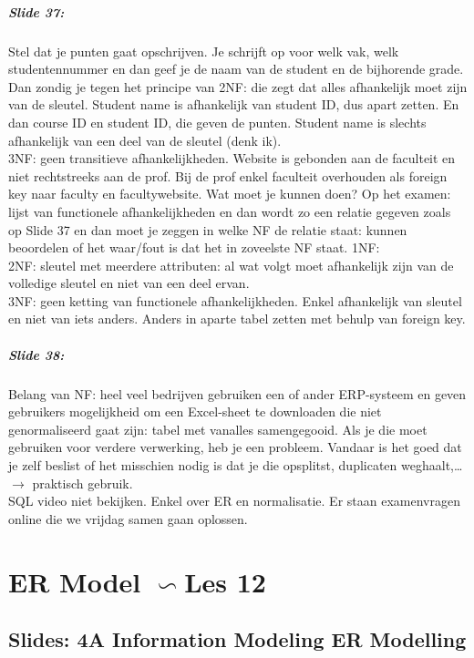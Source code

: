 \documentclass[10pt,a4paper]{report}
\begin{document}
\paragraph{Slide 37:}Stel dat je punten gaat opschrijven. Je schrijft op voor welk vak, welk studentennummer en dan geef je de naam van de student en de bijhorende grade. Dan zondig je tegen het principe van 2NF: die zegt dat alles afhankelijk moet zijn van de sleutel. Student name is afhankelijk van student ID, dus apart zetten. En dan course ID en student ID, die geven de punten. Student name is slechts afhankelijk van een deel van de sleutel (denk ik).\\
3NF: geen transitieve afhankelijkheden. Website is gebonden aan de faculteit en niet rechtstreeks aan de prof. Bij de prof enkel faculteit overhouden als foreign key naar faculty en facultywebsite.
Wat moet je kunnen doen? Op het examen: lijst van functionele afhankelijkheden en dan wordt zo een relatie gegeven zoals op Slide 37 en dan moet je zeggen in welke NF de relatie staat: kunnen beoordelen of het waar/fout is dat het in zoveelste NF staat.
1NF:\\
2NF: sleutel met meerdere attributen: al wat volgt moet afhankelijk zijn van de volledige sleutel en niet van een deel ervan.\\
3NF: geen ketting van functionele afhankelijkheden. Enkel afhankelijk van sleutel en niet van iets anders. Anders in aparte tabel zetten met behulp van foreign key.

\paragraph{Slide 38:}Belang van NF: heel veel bedrijven gebruiken een of ander ERP-systeem en geven gebruikers mogelijkheid om een Excel-sheet te downloaden die niet genormaliseerd gaat zijn: tabel met vanalles samengegooid. Als je die moet gebruiken voor verdere verwerking, heb je een probleem. Vandaar is het goed dat je zelf beslist of het misschien nodig is dat je die opsplitst, duplicaten weghaalt,… $\rightarrow$ praktisch gebruik.\\

SQL video niet bekijken. Enkel over ER en normalisatie. Er staan examenvragen online die we vrijdag samen gaan oplossen.

\chapter{ER Model $\backsim$Les 12}
\section{Slides: 4A Information Modeling \- ER Modelling}
\end{document}
